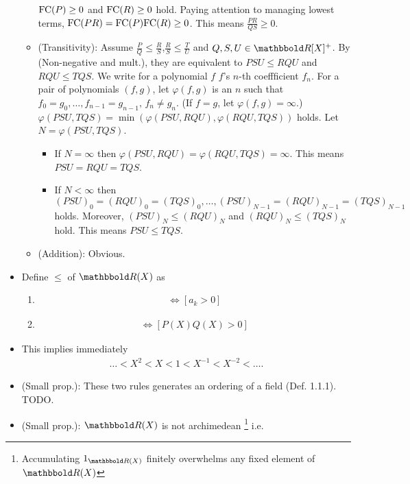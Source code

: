 \documentclass[9pt]{ltjsarticle}
\begin{document}
\begin{itemize}
\begin{itemize}
    $\mathrm{FC}(P) \ge 0$ and $\mathrm{FC}(R) \ge 0$ hold.
    Paying attention to managing lowest terms, $\mathrm{FC}(PR)=\mathrm{FC}(P)\mathrm{FC}(R)\ge0$.
    This means $\frac{PR}{QS} \ge 0$.
    \item (Transitivity):
    Assume $\frac{P}{Q}\le \frac{R}{S}$,$\frac{R}{S} \le \frac{T}{U}$ and
    $Q,S,U\in \R [X]^+$.
    By (Non-negative and mult.), they are equivalent to
    $PSU\le RQU$ and $RQU\le TQS$.
    We write for a polynomial $f$ $f$'s $n$-th coeffficient $f_n$.
    For a pair of polynomials $(f,g)$, let $\varphi(f,g)$  is an $n$
    such that $f_0 = g_0,\dots, f_{n-1}=g_{n-1},\, f_n \neq g_n$.
    (If $f=g$, let $\varphi(f,g)=\infty$.)
    $\varphi(PSU,TQS)=\min(\varphi(PSU,RQU), \varphi(RQU,TQS))$ holds.
    Let $N=\varphi(PSU,TQS)$.
    \begin{itemize}
      \item If $N=\infty$ then $\varphi(PSU,RQU)=\varphi(RQU,TQS)=\infty$.
      This means $PSU=RQU=TQS$.
      \item If $N<\infty$ then $(PSU)_0=(RQU)_0=(TQS)_0,\dots,(PSU)_{N-1}=(RQU)_{N-1}=(TQS)_{N-1}$ holds.
      Moreover, $(PSU)_N \le (RQU)_N$ and $(RQU)_N \le (TQS)_N$ hold.
      This means $PSU \le TQS$.
    \end{itemize}
    \item (Addition):
    Obvious.
  \end{itemize}
  \item
  Define $\le$ of $\R (X)$ as
  \begin{enumerate}
    \item
    \begin{align}
      [a_k X^k + \dots + a_n X^n \ge 0 ,\, a_k \neq 0,\, k\le n]
      \iff
      [a_k > 0]
    \end{align}
    \item
    \begin{align}
        [P(X)/Q(X) > 0] \iff [P(X)Q(X)>0]
    \end{align}
  \end{enumerate}
  \item
  This implies immediately
  \begin{align}
    \dots < X^2 < X < 1 < X^{-1} < X^{-2} < \dots .
  \end{align}
  \item (Small prop.): These two rules generates an ordering of a field (Def. 1.1.1).
  \pf TODO.
  \item (Small prop.):
  $\R (X)$ is not archimedean \footnote{Accumulating $1_{\R (X)}$ finitely overwhelms any fixed element of $\R (X)$} i.e.

\end{itemize}
\end{document}
